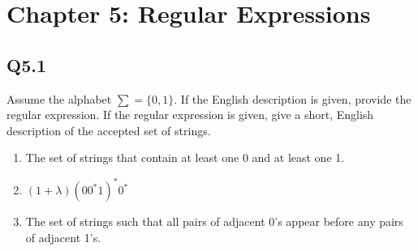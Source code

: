 \documentclass{article}
\begin{document}
\section*{Chapter 5: Regular Expressions}

\subsection*{Q5.1}
Assume the alphabet $\sum=\{0,1\}$. If the English description is given, provide the regular expression. If the regular expression is given, give a short, English description of the accepted set of strings.
\begin{enumerate}[label=\alph*.]
    \item The set of strings that contain at least one 0 and at least one 1.
    \item $(1+\lambda)(00^*1)^*0^*$
    \item The set of strings such that all pairs of adjacent 0's appear before any pairs of adjacent 1's.
\end{enumerate}
\newpage
\end{document}
